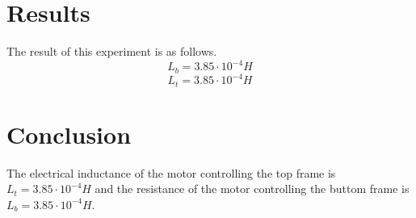 \documentclass[../main]{subfiles}
\begin{document}
\section{Results}

The result of this experiment is as follows.
$$L_b = 3.85 \cdot 10^{-4}H$$
$$L_t = 3.85 \cdot 10^{-4}H$$

\section{Conclusion}

The electrical inductance of the motor controlling the top frame is $L_t= 3.85 \cdot 10^{-4}H$ and the resistance of the motor controlling the buttom frame is $L_b= 3.85 \cdot 10^{-4}H$.
\end{document}
